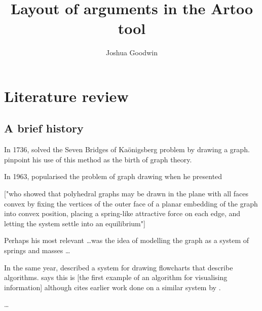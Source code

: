 \documentclass[authoryearcitations]{UoYCSproject}
\author{Joshua Goodwin}
\title{Layout of arguments in the Artoo tool}
\begin{document}
\maketitle









\chapter{Literature review}

\section{A brief history}

In 1736, \citet{euler} solved the Seven Bridges of Ka\"{o}nigsberg problem by drawing a graph.
\citet{ismail2009some}
pinpoint his use of this method as the birth of graph theory.

In 1963, \citet{tutte} popularised the problem of graph drawing when he presented 


["who showed that polyhedral graphs may be drawn in the plane with all faces convex by fixing the vertices of the outer face of a planar embedding of the graph into convex position, placing a spring-like attractive force on each edge, and letting the system settle into an equilibrium"]

Perhaps his most relevant \ldots was the idea of modelling the graph as a system of springs and masses \ldots 

In the same year, \citet{Knuth63} described a system for drawing flowcharts that describe algorithms. \citet{battista}  says this is [the first example of an algorithm for visualising information] although \citeauthor{Knuth63} cites earlier work done on a similar system by \citet{haibt1959}.




\ldots
\end{document}
